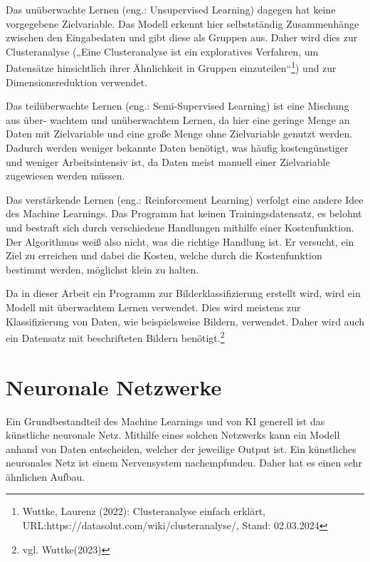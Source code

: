 \documentclass[11pt,oneside]{report}
\begin{document}
Das unüberwachte Lernen (eng.: Unsupervised Learning) dagegen hat keine vorgegebene Zielvariable. Das Modell erkennt hier selbstständig Zusammenhänge zwischen den Eingabedaten und gibt diese als Gruppen aus. Daher wird dies zur Clusteranalyse („Eine Clusteranalyse ist ein exploratives Verfahren, um Datensätze hinsichtlich ihrer Ähnlichkeit in Gruppen einzuteilen“\footnote{Wuttke, Laurenz (2022): Clusteranalyse einfach erklärt, URL:https://datasolut.com/wiki/clusteranalyse/, Stand: 02.03.2024}) und zur Dimensionsreduktion verwendet.

Das teilüberwachte Lernen (eng.: Semi-Supervised Learning) ist eine Mischung aus über- wachtem und unüberwachtem Lernen, da hier eine geringe Menge an Daten mit Zielvariable und eine große Menge ohne Zielvariable genutzt werden. Dadurch werden weniger bekannte Daten benötigt, was häufig kostengünstiger und weniger Arbeitsintensiv ist, da Daten meist manuell einer Zielvariable zugewiesen werden müssen.

Das verstärkende Lernen (eng.: Reinforcement Learning) verfolgt eine andere Idee des Machine Learnings. Das Programm hat keinen Trainingsdatensatz, es belohnt und bestraft sich durch verschiedene Handlungen mithilfe einer Kostenfunktion. Der Algorithmus weiß also nicht, was die richtige Handlung ist. Er versucht, ein Ziel zu erreichen und dabei die Kosten, welche durch die Kostenfunktion bestimmt werden, möglichst klein zu halten.

Da in dieser Arbeit ein Programm zur Bilderklassifizierung erstellt wird, wird ein Modell mit überwachtem Lernen verwendet. Dies wird meistens zur Klassifizierung von Daten, wie beispielsweise Bildern, verwendet. Daher wird auch ein Datensatz mit beschrifteten Bildern benötigt.\footnote{vgl. Wuttke(2023)}


\section{Neuronale Netzwerke}
Ein Grundbestandteil des Machine Learnings und von KI generell ist das künstliche neuronale Netz. Mithilfe eines solchen Netzwerks kann ein Modell anhand von Daten entscheiden, welcher der jeweilige Output ist. Ein künstliches neuronales Netz ist einem Nervensystem nachempfunden. Daher hat es einen sehr ähnlichen Aufbau.
\end{document}
